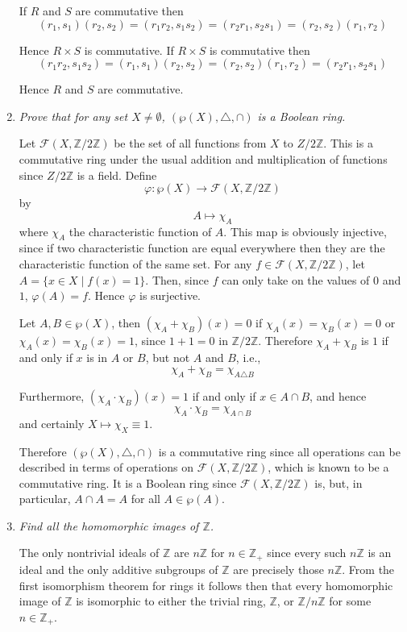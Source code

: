 \documentclass[letterpaper, 11pt]{article}
\newcommand{\powset}[1]{
\wp\left(#1\right)
}
\newcommand{\Z}{\mathbb{Z}}
\begin{document}
\begin{enumerate}
If $R$ and $S$ are commutative then
\[
(r_1, s_1)(r_2, s_2) = (r_1r_2, s_1s_2) = (r_2r_1, s_2s_1) = (r_2,s_2)(r_1,r_2)
\]

Hence $R\times S$ is commutative.  If $R \times S$ is commutative then
\[
(r_1r_2, s_1s_2) = (r_1, s_1)(r_2, s_2) = (r_2,s_2)(r_1,r_2) = (r_2r_1, s_2s_1)
\]

Hence $R$ and $S$ are commutative.

\item \emph{Prove that for any set $X \neq \emptyset$, $(\powset{X}, \triangle, \cap)$ is a Boolean ring.}

Let $\mathcal{F}(X, \Z/2\Z)$ be the set of all functions from $X$ to $Z/2\Z$.  This is a commutative ring under the usual addition and multiplication of functions since $Z/2\Z$ is a field.  Define $$\varphi: \powset{X} \rightarrow \mathcal{F}(X, \Z/2\Z)$$ by $$A \mapsto \chi_A$$ where $\chi_A$ the characteristic function of $A$.  This map is obviously injective, since if two characteristic function are equal everywhere then they are the characteristic function of the same set.  For any $f \in \mathcal{F}(X, \Z/2\Z)$, let $A = \{x \in X \mid f(x) = 1\}$.  Then, since $f$ can only take on the values of $0$ and $1$, $\varphi(A) = f$.  Hence $\varphi$ is surjective.

Let $A,B \in \powset{X}$, then $\left(\chi_A + \chi_B\right)(x) = 0$ if $\chi_A(x) = \chi_B(x) = 0$ or $\chi_A(x) = \chi_B(x) = 1$, since $1+1 = 0$ in $\Z/2\Z$.  Therefore $\chi_A + \chi_B$ is $1$ if and only if $x$ is in $A$ or $B$, but not $A$ and $B$, i.e., $$\chi_A + \chi_B = \chi_{A \triangle B}$$

Furthermore, $\left(\chi_A \cdot \chi_B\right)(x) = 1$ if and only if $x \in A \cap B$, and hence $$\chi_A \cdot \chi_B = \chi_{A \cap B}$$ and certainly $X \mapsto \chi_X \equiv 1$.

Therefore $(\powset{X}, \triangle, \cap)$ is a commutative ring since all operations can be described in terms of operations on $\mathcal{F}(X, \Z/2\Z)$, which is known to be a commutative ring.   It is a Boolean ring since $\mathcal{F}(X, \Z/2\Z)$ is, but, in particular, $A \cap A = A$ for all $A \in \powset{A}$.

\item \emph{Find all the homomorphic images of $\Z$.}

The only nontrivial ideals of $\Z$ are $n\Z$ for $n \in \Z_+$ since every such $n\Z$ is an ideal and the only additive subgroups of $\Z$ are precisely those $n\Z$.  From the first isomorphism theorem for rings it follows then that every homomorphic image of $\Z$ is isomorphic to either the trivial ring, $\Z$, or $\Z/n\Z$ for some $n \in \Z_+$.


\end{enumerate}
\end{document}
